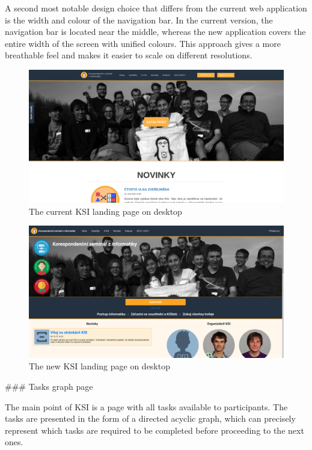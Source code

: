 \documentclass[
  digital, %
  oneside, %
  lof,     %
  nolot,     %
]{fithesis4}
\begin{document}
{A second most notable design choice that differs from the current web application is the width and colour of the navigation bar. In the current version, the navigation bar is located near the middle, whereas the new application covers the entire width of the screen with unified colours. This approach gives a more breathable feel and makes it easier to scale on different resolutions.

\begin{figure}
\includegraphics[width=\textwidth]{assets/img/welcome_curr}
\caption{The current \acrshort{KSI} landing page on desktop}
\label{fig:welcome-curr}
\end{figure}

\begin{figure}
\includegraphics[width=\textwidth]{assets/img/welcome_new}
\caption{The new \acrshort{KSI} landing page on desktop}
\label{fig:welcome-new}
\end{figure}

### Tasks graph page

The main point of \acrshort{KSI} is a page with all tasks available to participants. The tasks are presented in the form of a directed acyclic graph, which can precisely represent which tasks are required to be completed before proceeding to the next ones.

}
\end{document}
